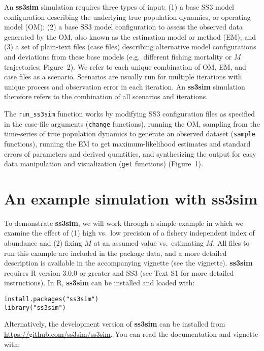 \documentclass[10pt]{article}
\begin{document}
An \textbf{ss3sim} simulation requires three types of input: (1) a base SS3
model configuration describing the underlying true population dynamics, or
operating model (OM); (2) a base SS3 model configuration to assess the observed
data generated by the OM, also known as the estimation model or method (EM);
and (3) a set of plain-text files (case files) describing alternative model
configurations and deviations from these base models (e.g.~different fishing
mortality or $M$ trajectories; Figure~2). We refer to each unique
combination of OM, EM, and case files as a scenario. Scenarios are usually run
for multiple iterations with unique process and observation error in each
iteration. An \textbf{ss3sim} simulation therefore refers to the combination of
all scenarios and iterations.

The \texttt{run\_ss3sim} function works by modifying SS3 configuration files as
specified in the case-file arguments (\texttt{change} functions), running the
OM, sampling from the time-series of true population dynamics to generate an
observed dataset (\texttt{sample} functions), running the EM to get
maximum-likelihood estimates and standard errors of parameters and
derived quantities, and synthesizing the output for easy data
manipulation and visualization (\texttt{get} functions) (Figure~1).

\section*{An example simulation with ss3sim}

To demonstrate \textbf{ss3sim}, we will work through a simple example in which
we examine the effect of (1) high vs.~low precision of a fishery independent
index of abundance and (2) fixing $M$ at an assumed value vs.~estimating
$M$. All files to run this example are included in the package data, and a more
detailed description is available in the accompanying vignette (see the vignette).
\textbf{ss3sim} requires \textsf{R} version 3.0.0 or greater and SS3 (see Text
S1 for more detailed instructions). In \textsf{R}, \textbf{ss3sim} can be
installed and loaded with:

\begin{verbatim}
install.packages("ss3sim")
library("ss3sim")
\end{verbatim}

\noindent
Alternatively, the development version of \textbf{ss3sim} can be installed from
\url{https://github.com/ss3sim/ss3sim}. You can read the documentation and
vignette with:
\end{document}
